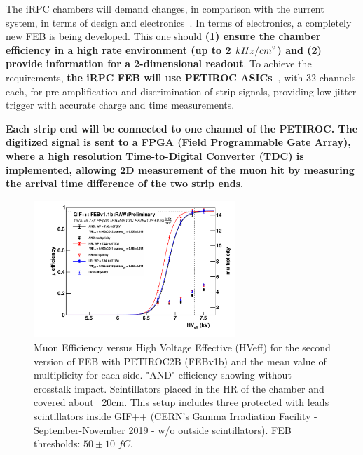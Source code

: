 The iRPC chambers will demand changes, in comparison with the current system, in terms of design and electronics~\cite{muon_tdr}. In terms of electronics, a completely new FEB is being developed. This one should \textbf{(1) ensure the chamber efficiency in a high rate environment (up to 2 ${\boldmath kHz/cm^2}$) and (2) provide information for a 2-dimensional readout}. To achieve the requirements, \textbf{the iRPC FEB will use PETIROC ASICs~\cite{petiroc}}, with 32-channels each, for pre-amplification and discrimination of strip signals, providing low-jitter trigger with accurate charge and time measurements. 


\begin{tcolorbox}[colback=gray!5,colframe=gray!40!black]
    \textbf{Each strip end will be connected to one channel of the PETIROC. The digitized signal is sent to a FPGA (Field Programmable Gate Array), where a high resolution Time-to-Digital Converter (TDC) is implemented, allowing 2D measurement of the muon hit by measuring the arrival time difference of the two strip ends}.
\end{tcolorbox}

\begin{figure}
    \caption{\footnotesize Muon Efficiency versus High Voltage Effective (HVeff) for the second version of FEB with PETIROC2B (FEBv1b) and the mean value of multiplicity for each side. "AND" efficiency showing without crosstalk impact. Scintillators placed in the HR of the chamber and covered about ~20cm. This setup includes three protected with leads scintillators inside GIF++ (CERN's Gamma Irradiation Facility - September-November 2019 - w/o outside scintillators). FEB thresholds: $50\pm10$ $fC$.}\label{irpc_feb}

    \includegraphics[width=0.68\textwidth, trim = {2.5cm 0 0.5cm 0 }, clip]{uioposter-images/FEBv1i1b_2b_50f_1675}
\end{figure}

